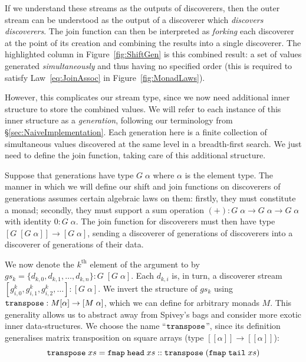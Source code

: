 If we understand these streams as the outputs of discoverers, then the outer stream can be understood as the output of a discoverer which \emph{discovers discoverers}. The join function can then be interpreted as \emph{forking} each discoverer at the point of its creation and combining the results into a single discoverer. The highlighted column in Figure~\ref{fig:ShiftGen} is this combined result: a set of values generated \emph{simultaneously} and thus having no specified order (this is required to satisfy Law~\ref{eq:JoinAssoc} in Figure~\ref{fig:MonadLaws}).

However, this complicates our stream type, since we now need additional inner structure to store the combined values. We will refer to each instance of this inner structure as a \emph{generation}, following our terminology from \S\ref{sec:NaiveImplementation}. Each generation here is a finite collection of simultaneous values discovered at the same level in a breadth-first search. We just need to define the join function, taking care of this additional structure.

Suppose that generations have type $G\;\alpha$ where $\alpha$ is the element type. The manner in which we will define our shift and join functions on discoverers of generations assumes certain algebraic laws on them: firstly, they must constitute a monad; secondly, they must support a sum operation \mbox{$(+):G\;\alpha\rightarrow G\;\alpha\rightarrow G\;\alpha$} with identity $0:G\;\alpha$. The join function for discoverers must then have type $[G\;[G\;\alpha]] \rightarrow [G\;\alpha]$, sending a discoverer of generations of discoverers into a discoverer of generations of their data. 

We now denote the $k^{\text{th}}$ element of the argument to  by $gs_k = \{d_{k,0}, d_{k,1}, \ldots, d_{k,n}\} : G\;[G\;\alpha] $. Each $d_{k,i}$ is, in turn, a discoverer stream $[g^k_{i,0}, g^k_{i,1}, g^k_{i,2}, \ldots] : [G\;\alpha]$. We invert the structure of $gs_k$ using $\texttt{transpose}  : M[\alpha]\rightarrow [M\;\alpha]$, which we can define for arbitrary monads $M$. This generality allows us to abstract away from Spivey's bags and consider more exotic inner data-structures. We choose the name ``$\texttt{transpose}$'', since its definition generalises matrix transposition on square arrays (type $[[\alpha]]\rightarrow[[\alpha]]$):
\begin{displaymath}
\texttt{transpose}\;xs = \texttt{fmap}\;\texttt{head}\;xs :: \texttt{transpose}\; (\texttt{fmap}\;\texttt{tail}\;xs)
\end{displaymath}


